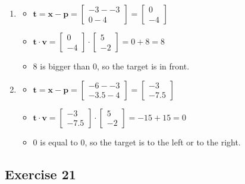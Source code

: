 \documentclass[11pt]{article}
\begin{document}
\begin{enumerate}[a.]
\begin{enumerate}[1.)]
	\item %
	\begin{itemize}
		\item $\textbf{t}=\textbf{x}-\textbf{p}=\begin{bmatrix}
-3 - -3 \\ 0 - 4		
\end{bmatrix}=\begin{bmatrix}
0 \\ -4	
\end{bmatrix}$
		\item $\textbf{t} \cdot \textbf{v} =
\begin{bmatrix}
0 \\ -4	
\end{bmatrix}\cdot
\begin{bmatrix}
5 \\ -2	
\end{bmatrix}=0+8=8$
		\item $8$ is bigger than $0$, so the target is in front.
	\end{itemize}
	
	\item %
	\begin{itemize}
		\item $\textbf{t}=\textbf{x}-\textbf{p}=\begin{bmatrix}
-6 - -3 \\ -3.5 - 4		
\end{bmatrix}=\begin{bmatrix}
-3 \\ -7.5	
\end{bmatrix}$
		\item $\textbf{t} \cdot \textbf{v} =
\begin{bmatrix}
-3 \\ -7.5 	
\end{bmatrix}\cdot
\begin{bmatrix}
5 \\ -2	
\end{bmatrix}=-15+15=0$
		\item $0$ is equal to $0$, so the target is to the left or to the right.
	\end{itemize}
\end{enumerate}

\end{enumerate}

\subsection{Exercise 21}
\end{document}
